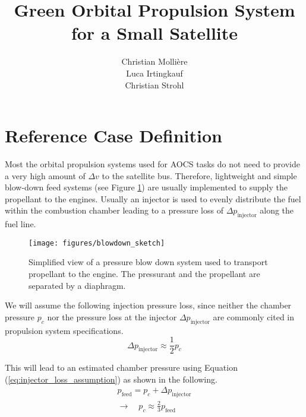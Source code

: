 \documentclass[12pt]{article}
\begin{document}
 
 
\title{Green Orbital Propulsion System for a Small Satellite}
\author{Christian Molli\`ere\\Luca Irtingkauf\\Christian Strohl}
\maketitle
\newpage
\tableofcontents
\newpage
\section{Reference Case Definition}
\label{chap:reference_case}
Most the orbital propulsion systems used for AOCS tasks do not need to provide a very high amount of $\Delta v$ to the satellite bus. Therefore, lightweight and simple blow-down feed systems (see Figure \ref{fig:blowdown_system}) are usually implemented to supply the propellant to the engines. Usually an injector is used to evenly distribute the fuel within the combustion chamber leading to a pressure loss of $\Delta p_{\text{injector}}$ along the fuel line.\\

\begin{figure}[!h]
	\centering
	\texttt{[image: figures/blowdown\_sketch]}
	\caption{Simplified view of a pressure blow down system used to transport propellant to the engine. The pressurant and the propellant are separated by a diaphragm.}
	\label{fig:blowdown_system}
\end{figure}

We will assume the following injection pressure loss, since neither the chamber pressure $p_c$ nor the pressure loss at the injector $\Delta p_{\text{injector}}$ are commonly cited in propulsion system specifications.
\begin{equation}
	\Delta p_{\text{injector}} \approx \frac{1}{2}p_c 
	\label{eq:injector_loss_assumption}
\end{equation}

This will lead to an estimated chamber pressure using Equation (\ref{eq:injector_loss_assumption}) as shown in the following.
\begin{gather}
	p_{\text{feed}} = p_c + \Delta p_{\text{injector}} \\
	\rightarrow \quad p_c \approx \frac{2}{3} p_{\text{feed}}
	\label{eq:chamber_pressure_estimation}
\end{gather}
\end{document}
